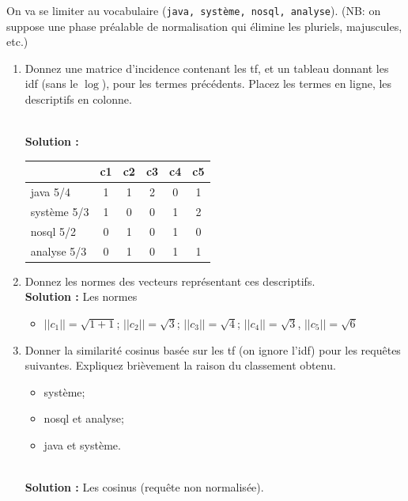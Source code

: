 \documentclass[11pt,a4paper]{article}
\newenvironment{solution}[0]{
~\\ \color{red} \textbf{Solution : }\color{black}}{%
}
\begin{document}
\bigskip

On va se limiter au vocabulaire (\texttt{java, système, nosql, analyse}).
(NB: on suppose
     une phase préalable de normalisation qui élimine les pluriels, majuscules, etc.)

\begin{enumerate}
   \item Donnez une matrice d'incidence contenant les tf, 
      et un tableau donnant les idf (sans le $\log$), pour les  termes précédents. Placez
      les termes en ligne, les descriptifs en colonne.

\begin{solution}
\begin{center}
\begin{tabular}{l|c|c|c|c|c}
            & \textbf{c1} & \textbf{c2} & \textbf{c3} &\textbf{c4}&\textbf{c5} \\ \hline  
   java  5/4   & 1           & 1           & 2           & 0         & 1\\
   système 5/3  & 1           & 0           & 0           & 1         & 2\\
   nosql 5/2  & 0           & 1           & 0           & 1         & 0\\
   analyse 5/3  & 0           & 1           & 0           & 1         & 1\\\hline
   \end{tabular}
\end{center}
\end{solution}

  \item Donnez les normes des vecteurs représentant ces descriptifs.
\begin{solution}
Les normes
\begin{itemize}
  \item $||c_1|| = \sqrt{1+ 1}$; $||c_2|| = \sqrt{3}$; $||c_3|| = \sqrt{4}$; 
    $||c_4|| = \sqrt{3}$, $||c_5|| = \sqrt{6}$  
\end{itemize}
\end{solution}
  
  \item Donner la similarité cosinus basée sur les tf 
  (on ignore l'idf) pour les requêtes suivantes. Expliquez brièvement la raison
  du classement obtenu.
  
  \begin{itemize}
    \item système;
    \item nosql et analyse;
    \item java et système.
  \end{itemize}
\begin{solution}
Les cosinus (requête non normalisée).


\end{solution}
\end{enumerate}
\end{document}
